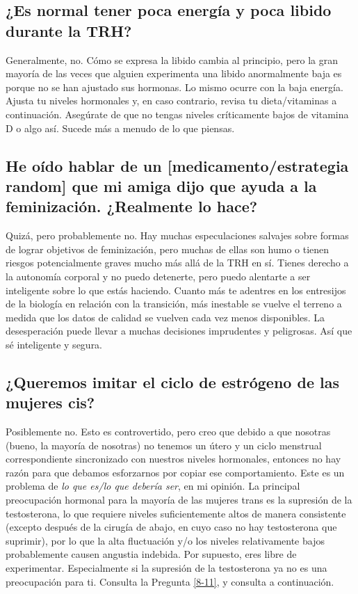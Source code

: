 \documentclass{article}
\begin{document}
\subsection{¿Es normal tener poca energía y poca libido durante la TRH?}

Generalmente, no. Cómo se expresa la libido cambia al principio, pero la gran mayoría de las veces que alguien experimenta una libido anormalmente baja es porque no se han ajustado sus hormonas. Lo mismo ocurre con la baja energía. Ajusta tu niveles hormonales y, en caso contrario, revisa tu dieta/vitaminas a continuación. Asegúrate de que no tengas niveles críticamente bajos de vitamina D o algo así. Sucede más a menudo de lo que piensas.

\subsection{He oído hablar de un [medicamento/estrategia random] que mi amiga dijo que ayuda a la feminización. ¿Realmente lo hace?}

Quizá, pero probablemente no. Hay muchas especulaciones salvajes sobre formas de lograr objetivos de feminización, pero muchas de ellas son humo o tienen riesgos potencialmente graves mucho más allá de la TRH en sí. Tienes derecho a la autonomía corporal y no puedo detenerte, pero puedo alentarte a ser inteligente sobre lo que estás haciendo. Cuanto más te adentres en los entresijos de la biología en relación con la transición, más inestable se vuelve el terreno a medida que los datos de calidad se vuelven cada vez menos disponibles. La desesperación puede llevar a muchas decisiones imprudentes y peligrosas. Así que sé inteligente y segura.

\subsection{¿Queremos imitar el ciclo de estrógeno de las mujeres cis?}\label{11-10}

Posiblemente no. Esto es controvertido, pero creo que debido a que nosotras (bueno, la mayoría de nosotras) no tenemos un útero y un ciclo menstrual correspondiente sincronizado con nuestros niveles hormonales, entonces no hay razón para que debamos esforzarnos por copiar ese comportamiento. Este es un problema de \textit{lo que es/lo que debería ser}, en mi opinión. La principal preocupación hormonal para la mayoría de las mujeres trans es la supresión de la testosterona, lo que requiere niveles suficientemente altos de manera consistente (excepto después de la cirugía de abajo, en cuyo caso no hay testosterona que suprimir), por lo que la alta fluctuación y/o los niveles relativamente bajos probablemente causen angustia indebida. Por supuesto, eres libre de experimentar. Especialmente si la supresión de la testosterona ya no es una preocupación para ti. Consulta la Pregunta \ref{8-11}, y consulta a continuación.
\end{document}
